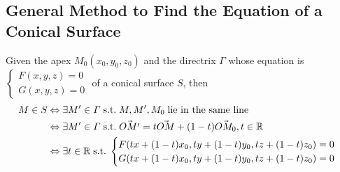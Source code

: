 \documentclass[onecolumn]{ctexart}
\begin{document}
\subsection{General Method to Find the Equation of a Conical Surface}
Given the apex $M_0(x_0, y_0, z_0)$ and the directrix $\varGamma$ whose equation is $
\begin{cases}
  F(x, y, z) = 0 \\
  G(x, y, z) = 0
\end{cases}$ of a conical surface $S$, then
\begin{equation}
  \begin{split}
    M \in S &\Leftrightarrow \exists M' \in \varGamma \thickspace \textnormal{s.t.} \thickspace M, M', M_0 \thickspace \textnormal{lie in the same line} \thickspace \\
            &\Leftrightarrow \exists M' \in \varGamma \thickspace \textnormal{s.t.} \thickspace \vec{OM'} = t\vec{OM} + (1 - t)\vec{OM_0}, t \in \mathbb{R} \\
            &\Leftrightarrow \exists t \in \mathbb{R} \thickspace \textnormal{s.t.} \thickspace
            \begin{cases}
              F(tx + (1 - t)x_0, ty + (1 - t)y_0, tz + (1 - t)z_0) = 0 \\
              G(tx + (1 - t)x_0, ty + (1 - t)y_0, tz + (1 - t)z_0) = 0
            \end{cases}
  \end{split}
\end{equation}
\end{document}
